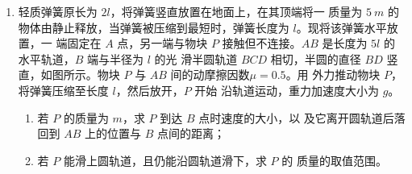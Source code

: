 \begin{enumerate}
\newpage
\item 
{}
轻质弹簧原长为 $ 2l $，将弹簧竖直放置在地面上，在其顶端将一
质量为 $ 5 \ m $ 的物体由静止释放，当弹簧被压缩到最短时，弹簧长度为 $ l $。现将该弹簧水平放置，一
端固定在 $ A $ 点，另一端与物块 $ P $ 接触但不连接。$ AB $ 是长度为 $ 5l $ 的水平轨道，$ B $ 端与半径为 $ l $ 的光
滑半圆轨道 $ BCD $ 相切，半圆的直径 $ BD $ 竖直，如图所示。物块 $ P $ 与 $ AB $ 间的动摩擦因数$ \mu =0.5 $。用
外力推动物块 $ P $，将弹簧压缩至长度 $ l $，然后放开，$ P $ 开始
沿轨道运动，重力加速度大小为 $ g $。
\begin{enumerate}
\renewcommand{\labelenumi}{\arabic{enumi}.}
\item
若 $ P $ 的质量为 $ m $，求 $ P $ 到达 $ B $ 点时速度的大小，以
及它离开圆轨道后落回到 $ AB $ 上的位置与 $ B $ 点间的距离；

\item 
若 $ P $ 能滑上圆轨道，且仍能沿圆轨道滑下，求 $ P $ 的
质量的取值范围。



\end{enumerate}
\begin{figure}[h!]
\flushright

\end{figure}







\end{enumerate}
